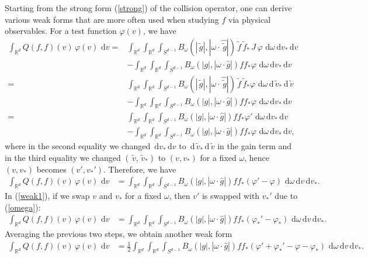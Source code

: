\documentclass[review,times]{elsarticle}
\newcommand{\rd}{\,\mathrm{d}}
\newcommand{\tv}{\,\tilde{v}}
\newcommand{\tg}{\,\tilde{g}}
\newcommand{\tf}{\,\tilde{f}}
\begin{document}
Starting from the strong form (\ref{strong}) of the collision operator, one can derive various weak forms that are more often used when studying $f$ via physical observables. For a test function $\varphi(v)$, we have
\begin{align}
\int_{\mathbb{R}^d} Q(f,f)(v)\,\varphi(v)\,\rd{v}=&\int_{\mathbb{R}^d}\int_{\mathbb{R}^d}\int_{S^{d-1}}B_{\omega}(|\tg|,|\omega\cdot \hat{\tg}|)\tf \tf_* \,J\,\varphi\,\rd{\omega}\rd{v_*}\rd{v}\nonumber\\
&  -\int_{\mathbb{R}^d}\int_{\mathbb{R}^d}\int_{S^{d-1}}B_{\omega}(|g|,|\omega\cdot \hat{g}|)ff_*\varphi\,\rd{\omega}\rd{v_*}\rd{v}\nonumber\\
=&\int_{\mathbb{R}^d}\int_{\mathbb{R}^d}\int_{S^{d-1}}B_{\omega}(|\tg|,|\omega\cdot \hat{\tg}|)\tf \tf_* \varphi\,\rd{\omega}\rd{\tv_*}\rd{\tv}\nonumber\\
& -\int_{\mathbb{R}^d}\int_{\mathbb{R}^d}\int_{S^{d-1}}B_{\omega}(|g|,|\omega\cdot \hat{g}|)ff_*\varphi\,\rd{\omega}\rd{v_*}\rd{v}\nonumber\\
=&\int_{\mathbb{R}^d}\int_{\mathbb{R}^d}\int_{S^{d-1}}B_{\omega}(|g|,|\omega\cdot \hat{g}|)ff_* \varphi'\,\rd{\omega}\rd{v_*}\rd{v}\nonumber\\
& -\int_{\mathbb{R}^d}\int_{\mathbb{R}^d}\int_{S^{d-1}}B_{\omega}(|g|,|\omega\cdot \hat{g}|)ff_*\varphi\,\rd{\omega}\rd{v_*}\rd{v},
\end{align}
where in the second equality we changed $\rd{v_*}\rd{v}$ to $\rd{\tv_*}\rd{\tv}$ in the gain term and in the third equality we changed $(\tv,\tv_*)$ to $(v,v_*)$ for a fixed $\omega$, hence $(v,v_*)$ becomes $(v',v_*')$. Therefore, we have
\begin{align} \label{weak1}
\int_{\mathbb{R}^d} Q(f,f)(v)\,\varphi(v)\,\rd{v}&= \int_{\mathbb{R}^d} \int_{\mathbb{R}^d} \int_{S^{d-1}} B_{\omega}(|g|,|\omega\cdot \hat{g}|)ff_*  \left(\varphi'-\varphi\right)\,\rd{\omega} \rd{v} \rd{v_*}.
\end{align}
In (\ref{weak1}), if we swap $v$ and $v_*$ for a fixed $\omega$, then $v'$ is swapped with $v_*'$ due to (\ref{omega}):
\begin{align}
\int_{\mathbb{R}^d} Q(f,f)(v)\,\varphi(v)\,\rd{v}&= \int_{\mathbb{R}^d} \int_{\mathbb{R}^d} \int_{S^{d-1}} B_{\omega}(|g|,|\omega\cdot \hat{g}|)ff_*  \left(\varphi_*'-\varphi_*\right)\,\rd{\omega} \rd{v} \rd{v_*}.
\end{align}
Averaging the previous two steps, we obtain another weak form
\begin{align} \label{weak2}
\int_{\mathbb{R}^d} Q(f,f)(v)\,\varphi(v)\,\rd{v}&=\frac{1}{2} \int_{\mathbb{R}^d} \int_{\mathbb{R}^d} \int_{S^{d-1}} B_{\omega}(|g|,|\omega\cdot \hat{g}|)ff_* \left(\varphi'+\varphi_*'-\varphi-\varphi_* \right)\,\rd{\omega}\rd{v} \rd{v_*}.
\end{align}
\end{document}
